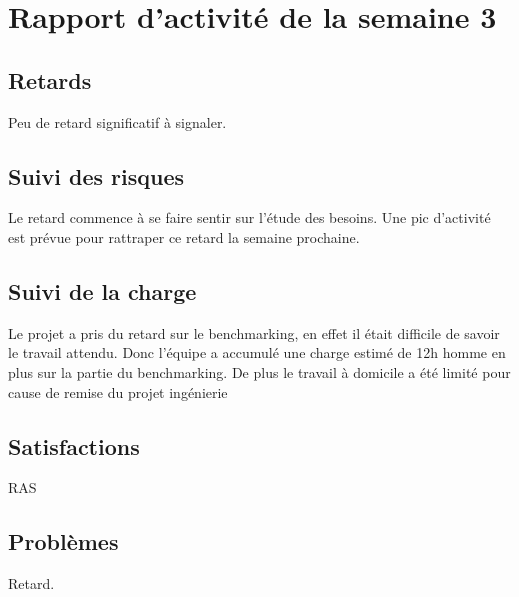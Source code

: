 \section{Rapport d'activité de la semaine 3}

\subsection{Retards}

Peu de retard significatif à signaler.

\subsection{Suivi des risques}

Le retard commence à se faire sentir sur l'étude des besoins. Une pic d'activité
est prévue pour rattraper ce retard la semaine prochaine.


\subsection{Suivi de la charge}

Le projet a pris du retard sur le benchmarking, en effet il était difficile
de savoir le travail attendu. Donc l'équipe a accumulé une charge estimé de 12h
homme en plus sur la partie du benchmarking. De plus le travail à domicile
a été limité pour cause de remise du projet ingénierie

\subsection{Satisfactions}

RAS

\subsection{Problèmes}

Retard.
